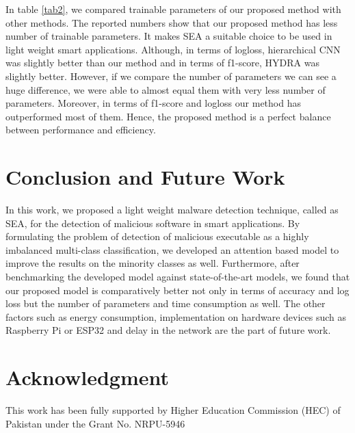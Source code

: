 \documentclass[conference]{IEEEtran}
\begin{document}
{{\begin{table*}[htbp]
\begin{center}
\begin{tabular}{|c|c|}
\end{tabular}
\label{tab2}
\end{center}
\end{table*}

In table \ref{tab2}, we compared trainable parameters of our proposed method with other methods. The reported numbers show that our proposed method has less number of trainable parameters. It makes SEA a suitable choice to be used in light weight smart applications. Although, in terms of logloss, hierarchical CNN was slightly better than our method and in terms of f1-score, HYDRA was slightly better. However, if we compare the number of parameters we can see a huge difference, we were able to almost equal them with very less number of parameters. Moreover, in terms of f1-score and logloss our method has outperformed most of them. Hence, the proposed method is a perfect balance between performance and efficiency.

\section{Conclusion and Future Work}
In this work, we proposed a light weight malware detection technique, called as SEA, for the detection of malicious software in smart applications. By formulating the problem of detection of malicious executable as a highly imbalanced multi-class classification, we developed an attention based model to improve the results on the minority classes as well.
Furthermore, after benchmarking the developed model against state-of-the-art models, we found that our proposed model is comparatively better not only in terms of accuracy and log loss but the number of parameters and time consumption as well. The other factors such as energy consumption, implementation on hardware devices such as Raspberry Pi or ESP32 and delay in the network are the part of future work. 

\section*{Acknowledgment}
This work has been fully supported by Higher Education Commission (HEC) of Pakistan under the Grant No. NRPU-5946

}}
\end{document}
